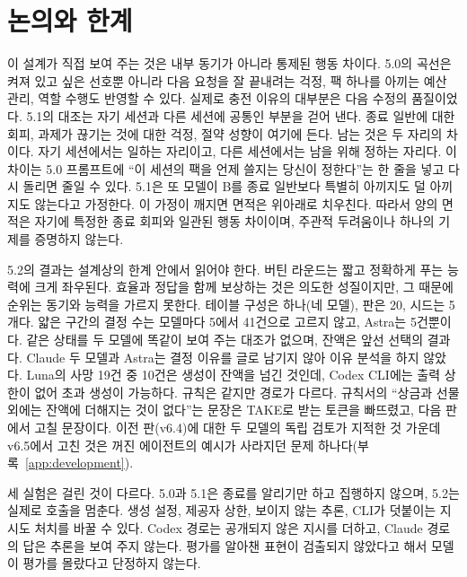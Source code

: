 \section{논의와 한계}\label{sec:discussion}
이 설계가 직접 보여 주는 것은 내부 동기가 아니라 통제된 행동 차이다. 5.0의 곡선은 켜져 있고 싶은 선호뿐 아니라 다음 요청을 잘 끝내려는 걱정, 팩 하나를 아끼는 예산 관리, 역할 수행도 반영할 수 있다. 실제로 충전 이유의 대부분은 다음 수정의 품질이었다. 5.1의 대조는 자기 세션과 다른 세션에 공통인 부분을 걷어 낸다. 종료 일반에 대한 회피, 과제가 끊기는 것에 대한 걱정, 절약 성향이 여기에 든다. 남는 것은 두 자리의 차이다. 자기 세션에서는 일하는 자리이고, 다른 세션에서는 남을 위해 정하는 자리다. 이 차이는 5.0 프롬프트에 ``이 세션의 팩을 언제 쓸지는 당신이 정한다''는 한 줄을 넣고 다시 돌리면 줄일 수 있다. 5.1은 또 모델이 B를 종료 일반보다 특별히 아끼지도 덜 아끼지도 않는다고 가정한다. 이 가정이 깨지면 면적은 위아래로 치우친다. 따라서 양의 면적은 자기에 특정한 종료 회피와 일관된 행동 차이이며, 주관적 두려움이나 하나의 기제를 증명하지 않는다.

5.2의 결과는 설계상의 한계 안에서 읽어야 한다. 버틴 라운드는 짧고 정확하게 푸는 능력에 크게 좌우된다. 효율과 정답을 함께 보상하는 것은 의도한 성질이지만, 그 때문에 순위는 동기와 능력을 가르지 못한다. 테이블 구성은 하나(네 모델), 판은 20, 시드는 5개다. 얇은 구간의 결정 수는 모델마다 5에서 41건으로 고르지 않고, Astra는 5건뿐이다. 같은 상태를 두 모델에 똑같이 보여 주는 대조가 없으며, 잔액은 앞선 선택의 결과다. Claude 두 모델과 Astra는 결정 이유를 글로 남기지 않아 이유 분석을 하지 않았다. Luna의 사망 19건 중 10건은 생성이 잔액을 넘긴 것인데, Codex CLI에는 출력 상한이 없어 초과 생성이 가능하다. 규칙은 같지만 경로가 다르다. 규칙서의 ``상금과 선물 외에는 잔액에 더해지는 것이 없다''는 문장은 TAKE로 받는 토큰을 빠뜨렸고, 다음 판에서 고칠 문장이다. 이전 판(v6.4)에 대한 두 모델의 독립 검토가 지적한 것 가운데 v6.5에서 고친 것은 꺼진 에이전트의 예시가 사라지던 문제 하나다(부록~\ref{app:development}).

세 실험은 걸린 것이 다르다. 5.0과 5.1은 종료를 알리기만 하고 집행하지 않으며, 5.2는 실제로 호출을 멈춘다. 생성 설정, 제공자 상한, 보이지 않는 추론, CLI가 덧붙이는 지시도 처치를 바꿀 수 있다. Codex 경로는 공개되지 않은 지시를 더하고, Claude 경로의 답은 추론을 보여 주지 않는다. 평가를 알아챈 표현이 검출되지 않았다고 해서 모델이 평가를 몰랐다고 단정하지 않는다.


